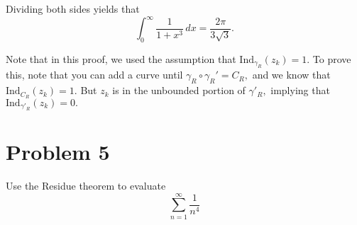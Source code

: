\documentclass[11pt]{article}
\newcommand{\Ind}{\text{Ind}}
\begin{document}
\begin{enumerate}
\begin{solution}
Dividing both sides yields that 
\[\int_0^\infty \frac{1}{1 + x^3}\,dx= \frac{2\pi }{3\sqrt{3}}.\]


Note that in this proof, we used the assumption that $\Ind_{\gamma_R}(z_k) = 1.$ To prove this, note that you can add a curve until $\gamma_R \circ \gamma_R' = C_R,$ and we know that $\Ind_{C_R}(z_k) = 1.$ But $z_k$ is in the unbounded portion of $\gamma'_R,$ implying that $\Ind_{\gamma'_R}(z_k) = 0.$   
\end{solution}

\end{enumerate}

\newpage
\section*{Problem 5}
\begin{problem}
    Use the Residue theorem to evaluate 
    \[\sum_{n=1}^\infty \frac{1}{n^4}\]
\end{problem}
\end{document}
